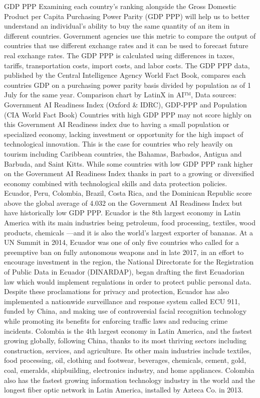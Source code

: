 \documentclass[journal]{IEEEtran}
\begin{document}
GDP PPP
Examining each country’s ranking alongside the Gross Domestic Product per Capita Purchasing Power Parity (GDP PPP) will help us to better understand an individual’s ability to buy the same quantity of an item in different countries. Government agencies use this metric to compare the output of countries that use different exchange rates and it can be used to forecast future real exchange rates. The GDP PPP is calculated using differences in taxes, tariffs, transportation costs, import costs, and labor costs.
The GDP PPP data, published by the Central Intelligence Agency World Fact Book, compares each countries GDP on a purchasing power parity basis divided by population as of 1 July for the same year.
Comparison chart by LatinX in AI™, Data sources: Government AI Readiness Index (Oxford \& IDRC), GDP-PPP and Population (CIA World Fact Book)
Countries with high GDP PPP may not score highly on this Government AI Readiness index due to having a small population or specialized economy, lacking investment or opportunity for the high impact of technological innovation. This is the case for countries who rely heavily on tourism including Caribbean countries, the Bahamas, Barbados, Antigua and Barbuda, and Saint Kitts.
While some countries with low GDP PPP rank higher on the Government AI Readiness Index thanks in part to a growing or diversified economy combined with technological skills and data protection policies. Ecuador, Peru, Colombia, Brazil, Costa Rica, and the Dominican Republic score above the global average of 4.032 on the Government AI Readiness Index but have historically low GDP PPP.
Ecuador is the 8th largest economy in Latin America with its main industries being petroleum, food processing, textiles, wood products, chemicals —and it is also the world’s largest exporter of bananas. At a UN Summit in 2014, Ecuador was one of only five countries who called for a preemptive ban on fully autonomous weapons and in late 2017, in an effort to encourage investment in the region, the National Directorate for the Registration of Public Data in Ecuador (DINARDAP), began drafting the first Ecuadorian law which would implement regulations in order to protect public personal data. Despite these proclamations for privacy and protection, Ecuador has also implemented a nationwide surveillance and response system called ECU 911, funded by China, and making use of controversial facial recognition technology while promoting its benefits for enforcing traffic laws and reducing crime incidents.
Colombia is the 4th largest economy in Latin America, and the fastest growing globally, following China, thanks to its most thriving sectors including construction, services, and agriculture. Its other main industries include textiles, food processing, oil, clothing and footwear, beverages, chemicals, cement, gold, coal, emeralds, shipbuilding, electronics industry, and home appliances. Colombia also has the fastest growing information technology industry in the world and the longest fiber optic network in Latin America, installed by Azteca Co. in 2013.
\end{document}
